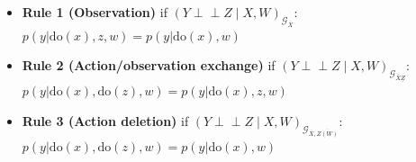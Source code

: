 \begin{tcbitemize}[ skin=sectionraster ]
    \begin{itemize}
        \item \textbf{Rule 1 (Observation)} if $(Y \perp\!\!\!\perp Z \mid X,W)_{\mathcal{G}_{\overline{X}}}$:
            $p(y|\mathrm{do}(x),z,w) = p(y|\mathrm{do}(x),w)$
        \item \textbf{Rule 2 (Action/observation exchange)} if
            $(Y \perp\!\!\!\perp Z \mid X,W)_{\mathcal{G}_{\overline{X}\underline{Z}}}$:
            $p(y|\mathrm{do}(x),\mathrm{do}(z),w) = p(y|\mathrm{do}(x),z,w)$
        \item \textbf{Rule 3 (Action deletion)} if
            $(Y \perp\!\!\!\perp Z \mid X,W)_{\mathcal{G}_{\overline{X},\overline{Z(W)}}}$:
            $p(y|\mathrm{do}(x),\mathrm{do}(z),w) = p(y|\mathrm{do}(x),w)$
    \end{itemize}

    \end{tcbitemize}

